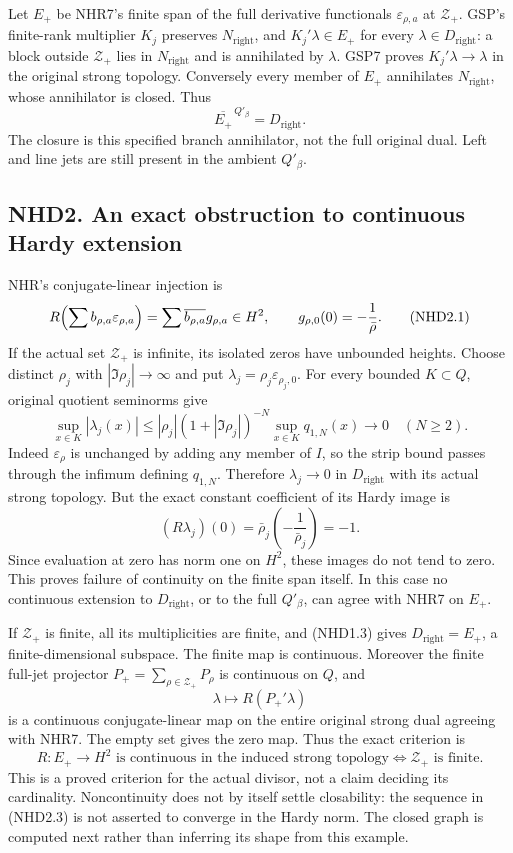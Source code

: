Let \(E_+\) be NHR7's finite span of the full derivative functionals
\(\varepsilon_{\rho,a}\) at \(\mathscr Z_+\). GSP's finite-rank
multiplier \(K_j\) preserves \(N_{\mathrm{right}}\), and
\(K_j'\lambda\in E_+\) for every \(\lambda\in D_{\mathrm{right}}\): a
block outside \(\mathscr Z_+\) lies in \(N_{\mathrm{right}}\) and is
annihilated by \(\lambda\). GSP7 proves \(K_j'\lambda\to\lambda\) in the
original strong topology. Conversely every member of \(E_+\) annihilates
\(N_{\mathrm{right}}\), whose annihilator is closed. Thus \[
\boxed{\overline{E_+}^{\,Q'_\beta}=D_{\mathrm{right}}.}
\tag{NHD1.3}
\] The closure is this specified branch annihilator, not the full
original dual. Left and line jets are still present in the ambient
\(Q'_\beta\).

\subsection{NHD2. An exact obstruction to continuous Hardy
extension}\label{nhd2.-an-exact-obstruction-to-continuous-hardy-extension}

NHR's conjugate-linear injection is \[
R\Bigl(\sum b_{\rho,a}\varepsilon_{\rho,a}\Bigr)
=\sum\overline{b_{\rho,a}}g_{\rho,a}\in H^2,
\qquad g_{\rho,0}(0)=-\frac1{\bar\rho}.
\tag{NHD2.1}
\] If the actual set \(\mathscr Z_+\) is infinite, its isolated zeros
have unbounded heights. Choose distinct \(\rho_j\) with
\(|\Im\rho_j|\to\infty\) and put
\(\lambda_j=\rho_j\varepsilon_{\rho_j,0}\). For every bounded
\(K\subset Q\), original quotient seminorms give \[
\sup_{x\in K}|\lambda_j(x)|
\le |\rho_j|(1+|\Im\rho_j|)^{-N}
\sup_{x\in K}q_{1,N}(x)\longrightarrow0
\quad(N\ge2).
\tag{NHD2.2}
\] Indeed \(\varepsilon_\rho\) is unchanged by adding any member of
\(I\), so the strip bound passes through the infimum defining
\(q_{1,N}\). Therefore \(\lambda_j\to0\) in \(D_{\mathrm{right}}\) with
its actual strong topology. But the exact constant coefficient of its
Hardy image is \[
(R\lambda_j)(0)=\bar\rho_j\left(-\frac1{\bar\rho_j}\right)=-1.
\tag{NHD2.3}
\] Since evaluation at zero has norm one on \(H^2\), these images do not
tend to zero. This proves failure of continuity on the finite span
itself. In this case no continuous extension to \(D_{\mathrm{right}}\),
or to the full \(Q'_\beta\), can agree with NHR7 on \(E_+\).

If \(\mathscr Z_+\) is finite, all its multiplicities are finite, and
(NHD1.3) gives \(D_{\mathrm{right}}=E_+\), a finite-dimensional
subspace. The finite map is continuous. Moreover the finite full-jet
projector \(P_+=\sum_{\rho\in\mathscr Z_+}P_\rho\) is continuous on
\(Q\), and \[
\lambda\longmapsto R(P_+'\lambda)
\tag{NHD2.4}
\] is a continuous conjugate-linear map on the entire original strong
dual agreeing with NHR7. The empty set gives the zero map. Thus the
exact criterion is \[
\boxed{R:E_+\to H^2\text{ is continuous in the induced strong topology}
\iff\mathscr Z_+\text{ is finite}.}
\tag{NHD2.5}
\] This is a proved criterion for the actual divisor, not a claim
deciding its cardinality. Noncontinuity does not by itself settle
closability: the sequence in (NHD2.3) is not asserted to converge in the
Hardy norm. The closed graph is computed next rather than inferring its
shape from this example.


